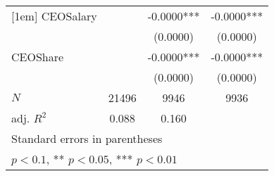 \begin{table}[htbp]
\begin{tabular}{l*{3}{c}}
[1em]
CEOSalary   &               &     -0.0000***&     -0.0000***\\
            &               &    (0.0000)   &    (0.0000)   \\
[1em]
CEOShare    &               &     -0.0000***&     -0.0000***\\
            &               &    (0.0000)   &    (0.0000)   \\
\hline
\(N\)       &       21496   &        9946   &        9936   \\
adj. \(R^{2}\)&       0.088   &       0.160   &               \\
\hline\hline
\multicolumn{4}{l}{\footnotesize Standard errors in parentheses}\\
\multicolumn{4}{l}{\footnotesize * \(p<0.1\), ** \(p<0.05\), *** \(p<0.01\)}\\
\end{tabular}
\end{table}
